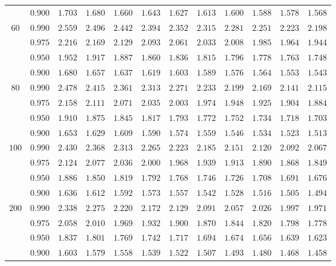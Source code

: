 \documentclass[11pt]{article}
\theoremstyle{definition}
\begin{document}
\begin{table}[H]
\begin{tabularx}{\linewidth}{c | c | c c c c c c c c c c}
		& $0.900$ & $1.703$ & $1.680$ & $1.660$ & $1.643$ & $1.627$ & $1.613$ & $1.600$ & $1.588$ & $1.578$ & $1.568$ \\
		$60$ & $0.990$ & $2.559$ & $2.496$ & $2.442$ & $2.394$ & $2.352$ & $2.315$ & $2.281$ & $2.251$ & $2.223$ & $2.198$ \\
		& $0.975$ & $2.216$ & $2.169$ & $2.129$ & $2.093$ & $2.061$ & $2.033$ & $2.008$ & $1.985$ & $1.964$ & $1.944$ \\
		& $0.950$ & $1.952$ & $1.917$ & $1.887$ & $1.860$ & $1.836$ & $1.815$ & $1.796$ & $1.778$ & $1.763$ & $1.748$ \\
		& $0.900$ & $1.680$ & $1.657$ & $1.637$ & $1.619$ & $1.603$ & $1.589$ & $1.576$ & $1.564$ & $1.553$ & $1.543$ \\
		$80$ & $0.990$ & $2.478$ & $2.415$ & $2.361$ & $2.313$ & $2.271$ & $2.233$ & $2.199$ & $2.169$ & $2.141$ & $2.115$ \\
		& $0.975$ & $2.158$ & $2.111$ & $2.071$ & $2.035$ & $2.003$ & $1.974$ & $1.948$ & $1.925$ & $1.904$ & $1.884$ \\
		& $0.950$ & $1.910$ & $1.875$ & $1.845$ & $1.817$ & $1.793$ & $1.772$ & $1.752$ & $1.734$ & $1.718$ & $1.703$ \\
		& $0.900$ & $1.653$ & $1.629$ & $1.609$ & $1.590$ & $1.574$ & $1.559$ & $1.546$ & $1.534$ & $1.523$ & $1.513$ \\
		$100$ & $0.990$ & $2.430$ & $2.368$ & $2.313$ & $2.265$ & $2.223$ & $2.185$ & $2.151$ & $2.120$ & $2.092$ & $2.067$ \\
		& $0.975$ & $2.124$ & $2.077$ & $2.036$ & $2.000$ & $1.968$ & $1.939$ & $1.913$ & $1.890$ & $1.868$ & $1.849$ \\
		& $0.950$ & $1.886$ & $1.850$ & $1.819$ & $1.792$ & $1.768$ & $1.746$ & $1.726$ & $1.708$ & $1.691$ & $1.676$ \\
		& $0.900$ & $1.636$ & $1.612$ & $1.592$ & $1.573$ & $1.557$ & $1.542$ & $1.528$ & $1.516$ & $1.505$ & $1.494$ \\
		$200$ & $0.990$ & $2.338$ & $2.275$ & $2.220$ & $2.172$ & $2.129$ & $2.091$ & $2.057$ & $2.026$ & $1.997$ & $1.971$ \\
		& $0.975$ & $2.058$ & $2.010$ & $1.969$ & $1.932$ & $1.900$ & $1.870$ & $1.844$ & $1.820$ & $1.798$ & $1.778$ \\
		& $0.950$ & $1.837$ & $1.801$ & $1.769$ & $1.742$ & $1.717$ & $1.694$ & $1.674$ & $1.656$ & $1.639$ & $1.623$ \\
		& $0.900$ & $1.603$ & $1.579$ & $1.558$ & $1.539$ & $1.522$ & $1.507$ & $1.493$ & $1.480$ & $1.468$ & $1.458$ \\

\end{tabularx}
\end{table}
\end{document}
